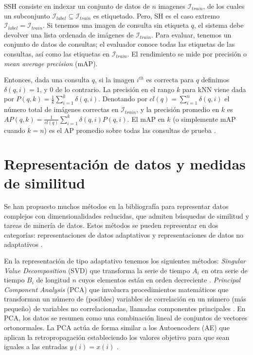 SSH consiste en indexar un conjunto de datos de $ n $ imagenes $ \mathcal{I}_{train} $, de los cuales un subconjunto $ \mathcal{I}_{label} \subseteq \mathcal{I}_{train} $ es etiquetado. Pero, SH es el caso extremo $ \mathcal{I}_{label} = \mathcal{I}_{train} $. Si tenemos una imagen de consulta sin etiqueta $ q $, el sistema debe devolver una lista ordenada de imágenes de $ \mathcal{I}_{train} $. Para evaluar, tenemos un conjunto de datos de consultas; el evaluador conoce todas las etiquetas de las consultas, así como las etiquetas en $ \mathcal{I}_{train} $. El rendimiento se mide por precisión o \textit{mean average precision} (mAP).

Entonces, dada una consulta $ q $, si la imagen $ i^{th} $ es correcta para $ q $ definimos $ \delta(q, i) = 1 $, y $ 0 $ de lo contrario. La precisión en el rango $ k $ para kNN viene dada por $ P(q, k) = \tfrac{1}{k} {\sum}_{i = 1}^{k} \delta(q, i) $. Denotando por $ cl(q) = {\sum}_{i = 1}^{n} \delta(q, i) $ el número total de imágenes correctas en $ \mathcal{I}_{train} $, y la precisión promedio en $ k $ es $ AP(q, k) = \tfrac{1}{cl(q)} {\sum}_{i = 1}^{k} \delta(q, i) P( q, i) $. El mAP en $ k $ (o simplemente mAP cuando $ k = n $) es el AP promedio sobre todas las consultas de prueba \cite{DBLP:journals/corr/SablayrollesDJU16}.

\section{Representación de datos y medidas de similitud}\label{sec:methods_reduce}

Se han propuesto muchos métodos en la bibliografía para representar datos complejos con dimensionalidades reducidas, que admiten búsquedas de similitud y tareas de minería de datos. Estos métodos se pueden representar en dos categorías: representaciones de datos adaptativos y representaciones de datos no adaptativos \cite{wang13}.

En la representación de  tipo adaptativo   tenemos los siguientes métodos: \textit{Singular Value Decomposition} (SVD) que transforma la serie de tiempo $ A_i $ en otra serie de tiempo $ B_i $ de longitud $ n $ cuyos elementos están en orden decreciente \cite{Bettaiah14}. \textit{Principal Component Analysis} (PCA) que involucra procedimientos matemáticos que transforman un número de (posibles) variables de correlación en un número (más pequeño) de variables no correlacionadas, llamadas componentes principales \cite{wekwek}. En PCA, los datos se resumen como una combinación lineal de conjuntos de vectores ortonormales. La PCA actúa de forma similar a los Autoencoders (AE) que aplican la retropropagación estableciendo los valores objetivo para que sean iguales a las entradas $ y(i) = x(i) $ \cite{wekwek}.

